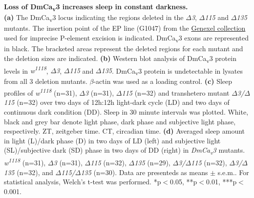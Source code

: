\label{fig:S2}
\textbf{Loss of DmCa\textsubscript{v}3 increases sleep in constant darkness.}
\\
\textbf{(a)} The DmCa\textsubscript{v}3 locus indicating the regions deleted in the \emph{$\Delta$3}, \emph{$\Delta$115} and \emph{$\Delta$135} mutants.
The insertion point of the EP line (G1047) from the \href{http://genexel.kaist.ac.kr}{Genexel collection} used for imprecise P-element excision is indicated.
DmCa\textsubscript{v}3 exons are represented in black.
The bracketed areas represent the deleted regions for each mutant and the deletion sizes are indicated.
\textbf{(b)} Western blot analysis of DmCa\textsubscript{v}3 protein levels in \emph{w\textsuperscript{1118}}, \emph{$\Delta$3}, \emph{$\Delta$115} and \emph{$\Delta$135}.
DmCa\textsubscript{v}3 protein is undetectable in lysates from all 3 deletion mutants.
$\beta$-actin was used as a loading control. 
\textbf{(c)} Sleep profiles of \emph{w\textsuperscript{1118}} (n=31), \emph{$\Delta$3} (n=31), \emph{$\Delta$115} (n=32) and transhetero mutant \emph{$\Delta$3/$\Delta$115} (n=32) over two days of 12h:12h light-dark cycle (LD) and two days of continuous dark condition (DD).
Sleep in 30 minute intervals was plotted.
White, black and grey bar denote light phase, dark phase and subjective light phase, respectively.
ZT, zeitgeber time.
CT, circadian time.
\textbf{(d)} Averaged sleep amount in light (L)/dark phase (D) in two days of LD (left) and subjective light (SL)/subjective dark (SD) phase in two days of DD (right) in \emph{DmCa\textsubscript{v}3} mutants.
\emph{w\textsuperscript{1118}} (n=31), \emph{$\Delta$3} (n=31), \emph{$\Delta$115} (n=32), \emph{$\Delta$135} (n=29), \emph{$\Delta$3/$\Delta$115} (n=32), \emph{$\Delta$3/$\Delta$135} (n=32), and \emph{$\Delta$115/$\Delta$135} (n=30).
Data are presenteds as means $\pm$ s.e.m..
For statistical analysis, Welch's t-test was performed.
*p$<$0.05, **p$<$0.01, ***p$<$0.001.
  
  
  
